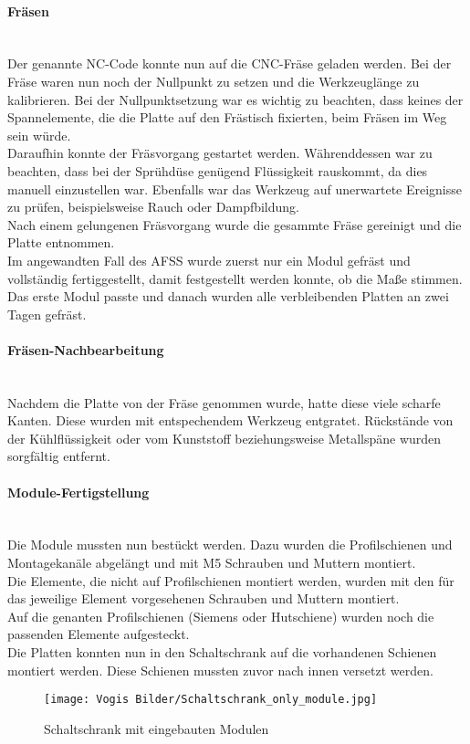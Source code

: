     \paragraph{Fräsen}\mbox{}\\
    Der genannte NC-Code konnte nun auf die CNC-Fräse geladen werden. Bei der Fräse waren nun noch der Nullpunkt zu setzen und die Werkzeuglänge zu kalibrieren. Bei der Nullpunktsetzung war es wichtig zu beachten, dass keines der Spannelemente, die die Platte auf den Frästisch fixierten, beim Fräsen im Weg sein würde.\\
    Daraufhin konnte der Fräsvorgang gestartet werden. Währenddessen war zu beachten, dass bei der Sprühdüse genügend Flüssigkeit rauskommt, da dies manuell einzustellen war. Ebenfalls war das Werkzeug auf unerwartete Ereignisse zu prüfen, beispielsweise Rauch oder Dampfbildung.\\ 
    Nach einem gelungenen Fräsvorgang wurde die gesammte Fräse gereinigt und die Platte entnommen.\\
    Im angewandten Fall des AFSS wurde zuerst nur ein Modul gefräst und vollständig fertiggestellt, damit festgestellt werden konnte, ob die Maße stimmen. Das erste Modul passte und danach wurden alle verbleibenden Platten an zwei Tagen gefräst.

    \paragraph{Fräsen-Nachbearbeitung}\mbox{}\\
    Nachdem die Platte von der Fräse genommen wurde, hatte diese viele scharfe Kanten. Diese wurden mit entspechendem Werkzeug entgratet. Rückstände von der Kühlflüssigkeit oder vom Kunststoff beziehungsweise Metallspäne wurden sorgfältig entfernt.
    \paragraph{Module-Fertigstellung}\mbox{}\\
    Die Module mussten nun bestückt werden. Dazu wurden die Profilschienen und Montagekanäle abgelängt und mit M5 Schrauben und Muttern montiert.\\
    Die Elemente, die nicht auf Profilschienen montiert werden, wurden mit den für das jeweilige Element vorgesehenen Schrauben und Muttern montiert.\\
    Auf die genanten Profilschienen (Siemens oder Hutschiene) wurden noch die passenden Elemente aufgesteckt.\\
    Die Platten konnten nun in den Schaltschrank auf die vorhandenen Schienen montiert werden. Diese Schienen mussten zuvor nach innen versetzt werden. 
    \begin{figure}[h]
        \centering
        \texttt{[image: Vogis Bilder/Schaltschrank\_only\_module.jpg]}
        \caption{Schaltschrank mit eingebauten Modulen}
        \label{fig:Schaltschrank_onlyModule}
    \end{figure}    
